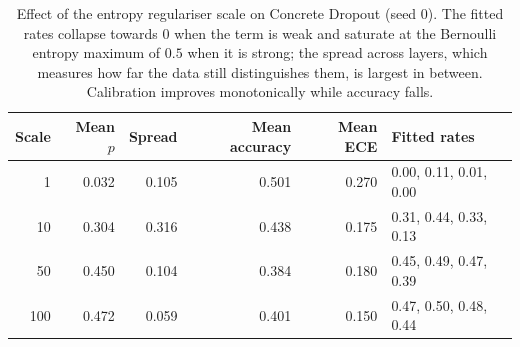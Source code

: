 \begin{table}[!htbp]
\centering
\caption{Effect of the entropy regulariser scale on Concrete Dropout (seed 0). The fitted rates collapse towards $0$ when the term is weak and saturate at the Bernoulli entropy maximum of $0.5$ when it is strong; the spread across layers, which measures how far the data still distinguishes them, is largest in between. Calibration improves monotonically while accuracy falls.}
\label{tab:dropout-sweep}
\small
\begin{tabular}{rrrrrl}
\toprule
Scale & Mean $p$ & Spread & Mean accuracy & Mean ECE & Fitted rates \\
\midrule
1 & 0.032 & 0.105 & 0.501 & 0.270 & 0.00, 0.11, 0.01, 0.00 \\
10 & 0.304 & 0.316 & 0.438 & 0.175 & 0.31, 0.44, 0.33, 0.13 \\
50 & 0.450 & 0.104 & 0.384 & 0.180 & 0.45, 0.49, 0.47, 0.39 \\
100 & 0.472 & 0.059 & 0.401 & 0.150 & 0.47, 0.50, 0.48, 0.44 \\
\bottomrule
\end{tabular}
\end{table}
